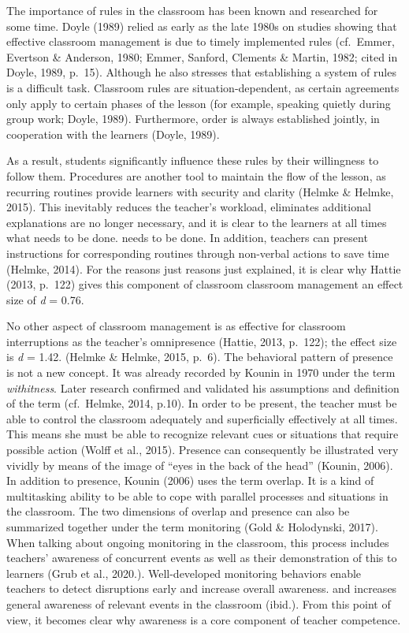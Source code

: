 \documentclass[
  man]{apa6}
\begin{document}
The importance of rules in the classroom has been known and researched for some time. Doyle (1989) relied as early as the late 1980s on studies showing that effective classroom management is due to timely implemented rules (cf.~Emmer, Evertson \& Anderson, 1980; Emmer, Sanford, Clements \& Martin, 1982; cited in Doyle, 1989, p.~15). Although he also stresses that establishing a system of rules is a difficult task. Classroom rules are situation-dependent, as certain agreements only apply to certain phases of the lesson (for example, speaking quietly during group work; Doyle, 1989). Furthermore, order is always established jointly, in cooperation with the learners (Doyle, 1989).

As a result, students significantly influence these rules by their willingness to follow them. Procedures are another tool to maintain the flow of the lesson, as recurring routines provide learners with security and clarity (Helmke \& Helmke, 2015). This inevitably reduces the teacher's workload, eliminates additional explanations are no longer necessary, and it is clear to the learners at all times what needs to be done. needs to be done. In addition, teachers can present instructions for corresponding routines through non-verbal actions to save time (Helmke, 2014). For the reasons just reasons just explained, it is clear why Hattie (2013, p.~122) gives this component of classroom classroom management an effect size of \emph{d} = 0.76.

No other aspect of classroom management is as effective for classroom interruptions as the teacher's omnipresence (Hattie, 2013, p.~122); the effect size is \emph{d} = 1.42. (Helmke \& Helmke, 2015, p.~6). The behavioral pattern of presence is not a new concept. It was already recorded by Kounin in 1970 under the term \emph{withitness}. Later research confirmed and validated his assumptions and definition of the term (cf.~Helmke, 2014, p.10). In order to be present, the teacher must be able to control the classroom adequately and superficially effectively at all times. This means she must be able to recognize relevant cues or situations that require possible action (Wolff et al., 2015). Presence can consequently be illustrated very vividly by means of the image of ``eyes in the back of the head'' (Kounin, 2006). In addition to presence, Kounin (2006) uses the term overlap. It is a kind of multitasking ability to be able to cope with parallel processes and situations in the classroom. The two dimensions of overlap and presence can also be summarized together under the term monitoring (Gold \& Holodynski, 2017). When talking about ongoing monitoring in the classroom, this process includes teachers' awareness of concurrent events as well as their demonstration of this to learners (Grub et al., 2020.). Well-developed monitoring behaviors enable teachers to detect disruptions early and increase overall awareness.
and increases general awareness of relevant events in the classroom (ibid.). From this point of view, it becomes clear why awareness is a core component of teacher competence.
\end{document}
